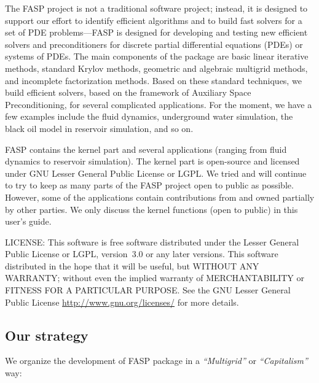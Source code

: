 \documentclass[11pt]{memoir}
\begin{document}
The FASP project is not a traditional software project; instead, it is designed to support our effort to identify efficient algorithms and to build fast solvers for a set of PDE problems---FASP is designed for developing and testing new efficient solvers and preconditioners for discrete partial differential equations (PDEs) or systems of PDEs. The main components of the package are basic linear iterative methods, standard Krylov methods, geometric and algebraic multigrid methods, and incomplete factorization methods. Based on these standard techniques, we build efficient solvers, based on the framework of Auxiliary Space Preconditioning, for several complicated applications. For the moment, we have a few examples include the fluid dynamics, underground water simulation, the black oil model in reservoir simulation, and so on.

FASP contains the kernel part and several applications (ranging from fluid dynamics to reservoir simulation). The kernel part is open-source and licensed under GNU Lesser General Public License or LGPL. We tried and will continue to try to keep as many parts of the FASP project open to public as possible. However, some of the applications contain contributions from and owned partially by other parties. We only discuss the kernel functions (open to public) in this user's guide.

\begin{snugshade}\noindent
LICENSE: This software is free software distributed under the Lesser General Public
License or LGPL, version~3.0 or any later versions. This software distributed
in the hope that it will be useful, but WITHOUT ANY WARRANTY; without even
the implied warranty of MERCHANTABILITY or FITNESS FOR A PARTICULAR PURPOSE. See the GNU Lesser General Public License \url{http://www.gnu.org/licenses/} for more details.
\end{snugshade}

\subsection{Our strategy}

We organize the development of FASP package in a \emph{``Multigrid''} or \emph{``Capitalism''} way:
\end{document}
